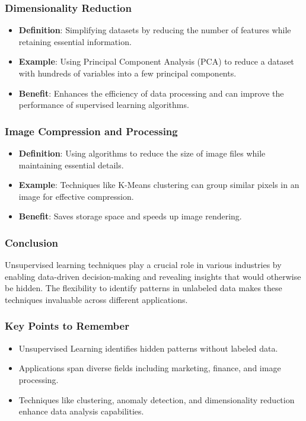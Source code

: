 \documentclass[aspectratio=169]{beamer}
\begin{document}
\begin{frame}[fragile]
  \frametitle{Dimensionality Reduction}
  \begin{itemize}
    \item \textbf{Definition}: Simplifying datasets by reducing the number of features while retaining essential information.
    \item \textbf{Example}: Using Principal Component Analysis (PCA) to reduce a dataset with hundreds of variables into a few principal components.
    \item \textbf{Benefit}: Enhances the efficiency of data processing and can improve the performance of supervised learning algorithms.
  \end{itemize}
\end{frame}

\begin{frame}[fragile]
  \frametitle{Image Compression and Processing}
  \begin{itemize}
    \item \textbf{Definition}: Using algorithms to reduce the size of image files while maintaining essential details.
    \item \textbf{Example}: Techniques like K-Means clustering can group similar pixels in an image for effective compression.
    \item \textbf{Benefit}: Saves storage space and speeds up image rendering.
  \end{itemize}
\end{frame}

\begin{frame}[fragile]
  \frametitle{Conclusion}
  Unsupervised learning techniques play a crucial role in various industries by enabling data-driven decision-making and revealing insights that would otherwise be hidden. The flexibility to identify patterns in unlabeled data makes these techniques invaluable across different applications.
\end{frame}

\begin{frame}[fragile]
  \frametitle{Key Points to Remember}
  \begin{itemize}
    \item Unsupervised Learning identifies hidden patterns without labeled data.
    \item Applications span diverse fields including marketing, finance, and image processing.
    \item Techniques like clustering, anomaly detection, and dimensionality reduction enhance data analysis capabilities.
  \end{itemize}
\end{frame}
\end{document}
